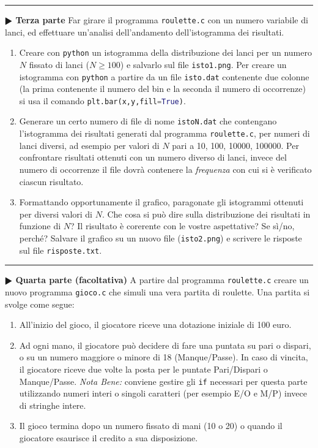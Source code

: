 \documentclass[11pt]{article}
\begin{document}
\hrule
\vspace{2mm}
\textbf{$\RHD$ Terza parte}
Far girare il programma \texttt{roulette.c} con un numero variabile di lanci,
ed effettuare un'analisi dell'andamento dell'istogramma dei risultati.
\begin{enumerate}
\item Creare con \texttt{python} un istogramma della distribuzione dei lanci per un numero $N$ fissato di lanci ($N \ge 100$) e salvarlo sul file \texttt{isto1.png}.
  Per creare un istogramma con \texttt{python} a partire da un file \texttt{isto.dat} contenente due colonne (la prima
  contenente il numero del bin e la seconda il numero di occorrenze)
si usa il comando \lstinline[language=Python]!plt.bar(x,y,fill=True)!.
\item Generare un certo numero di file di nome \texttt{istoN.dat} che contengano l'istogramma dei risultati generati dal programma \texttt{roulette.c}, per numeri di lanci diversi, ad esempio per valori di $N$ pari a 10, 100, 10000, 100000.
 Per confrontare risultati ottenuti con un numero diverso di lanci, invece del numero di occorrenze il file dovr\`a contenere
la {\em frequenza\/} con cui si \`e verificato ciascun risultato.
\item Formattando opportunamente il grafico, paragonate gli istogrammi ottenuti per diversi valori di $N$. Che cosa si
pu\`o dire sulla distribuzione dei risultati in funzione di $N$? Il risultato \`e corerente con le vostre aspettative? Se sì/no, perch\'e? Salvare il grafico su un nuovo file (\texttt{isto2.png}) e scrivere le risposte sul file \texttt{risposte.txt}.
\end{enumerate}


\hrule
\vspace{2mm}
\textbf{$\RHD$ Quarta parte (facoltativa)}
A partire dal programma \texttt{roulette.c} creare un nuovo programma \texttt{gioco.c} che simuli una vera
partita di roulette.
Una partita si svolge come segue:
\begin{enumerate}
\item All'inizio del gioco, il giocatore riceve una dotazione iniziale di 100 euro.
\item Ad ogni mano, il giocatore  pu\`o decidere di fare una puntata  su pari o dispari, o su un numero maggiore o minore di 18 (Manque/Passe). In caso di vincita, il giocatore riceve due volte la posta per le puntate Pari/Dispari o Manque/Passe. \textit{Nota Bene:} conviene gestire gli \texttt{if} necessari per questa parte utilizzando numeri interi o singoli caratteri (per esempio E/O e M/P) invece di stringhe intere.
\item Il gioco termina dopo un numero fissato di mani (10 o 20) o quando il giocatore esaurisce il credito a sua disposizione.
\end{enumerate}
\end{document}
